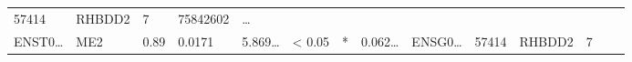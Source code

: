 \documentclass[
]{article}
\begin{document}
\begin{longtable}[]{@{}llllllllllllll@{}}
\begin{minipage}[t]{0.05\columnwidth}
57414\strut
\end{minipage} & \begin{minipage}[t]{0.05\columnwidth}\raggedright
RHBDD2\strut
\end{minipage} & \begin{minipage}[t]{0.05\columnwidth}\raggedright
7\strut
\end{minipage} & \begin{minipage}[t]{0.05\columnwidth}\raggedright
75842602\strut
\end{minipage} & \begin{minipage}[t]{0.02\columnwidth}\raggedright
\ldots{}\strut
\end{minipage}\tabularnewline
\begin{minipage}[t]{0.05\columnwidth}\raggedright
ENST0\ldots{}\strut
\end{minipage} & \begin{minipage}[t]{0.04\columnwidth}\raggedright
ME2\strut
\end{minipage} & \begin{minipage}[t]{0.04\columnwidth}\raggedright
0.89\strut
\end{minipage} & \begin{minipage}[t]{0.04\columnwidth}\raggedright
0.0171\strut
\end{minipage} & \begin{minipage}[t]{0.05\columnwidth}\raggedright
5.869\ldots{}\strut
\end{minipage} & \begin{minipage}[t]{0.05\columnwidth}\raggedright
\textless{} 0.05\strut
\end{minipage} & \begin{minipage}[t]{0.03\columnwidth}\raggedright
*\strut
\end{minipage} & \begin{minipage}[t]{0.05\columnwidth}\raggedright
0.062\ldots{}\strut
\end{minipage} & \begin{minipage}[t]{0.05\columnwidth}\raggedright
ENSG0\ldots{}\strut
\end{minipage} & \begin{minipage}[t]{0.05\columnwidth}\raggedright
57414\strut
\end{minipage} & \begin{minipage}[t]{0.05\columnwidth}\raggedright
RHBDD2\strut
\end{minipage} & \begin{minipage}[t]{0.05\columnwidth}\raggedright
7\strut

\end{minipage}
\end{longtable}
\end{document}
